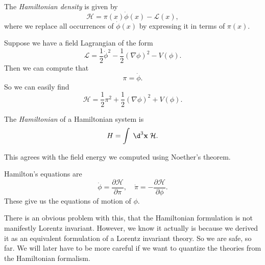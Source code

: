 \documentclass[a4paper]{article}
\begin{document}
\begin{defi}
  The \emph{Hamiltonian density} is given by
  \[
    \mathcal{H} = \pi(x) \dot{\phi}(x) - \mathcal{L}(x),
  \]
  where we replace all occurrences of $\dot{\phi}(x)$ by expressing it in terms of $\pi(x)$.
\end{defi}

\begin{eg}
  Suppose we have a field Lagrangian of the form
  \[
    \mathcal{L} = \frac{1}{2} \dot{\phi}^2 - \frac{1}{2} (\nabla \phi)^2 - V(\phi).
  \]
  Then we can compute that
  \[
    \pi = \dot\phi.
  \]
  So we can easily find
  \[
    \mathcal{H} = \frac{1}{2}\pi^2 + \frac{1}{2}(\nabla \phi)^2 + V(\phi).
  \]
\end{eg}

\begin{defi}[Hamiltonian]
  The \emph{Hamiltonian} of a Hamiltonian system is
  \[
    H = \int\;\d^3 \mathbf{x}\; \mathcal{H}.
  \]
\end{defi}
This agrees with the field energy we computed using Noether's theorem.

\begin{defi}
  Hamilton's equations are
  \[
    \dot{\phi} = \frac{\partial \mathcal{H}}{\partial \pi},\quad \dot{\pi} = -\frac{\partial \mathcal{H}}{\partial \phi}.
  \]
  These give us the equations of motion of $\phi$.
\end{defi}
There is an obvious problem with this, that the Hamiltonian formulation is not manifestly Lorentz invariant. However, we know it actually is because we derived it as an equivalent formulation of a Lorentz invariant theory. So we are safe, so far. We will later have to be more careful if we want to quantize the theories from the Hamiltonian formalism.
\end{document}
